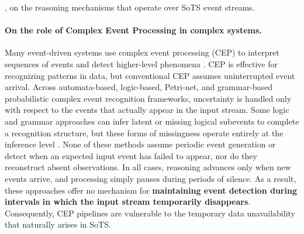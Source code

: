 ,  on the reasoning mechanisms that operate over SoTS event streams. 



\paragraph{On the role of Complex Event Processing in complex systems.}
Many event-driven systems use complex event processing (CEP) to interpret sequences of events and detect higher-level phenomena \cite{luckham2002power}. 
CEP is effective for recognizing patterns in data, but conventional CEP assumes uninterrupted event arrival.
Across automata-based, logic-based, Petri-net, and grammar-based probabilistic complex event recognition frameworks, uncertainty is handled only with respect to the events that actually appear in the input stream. Some logic and grammar approaches can infer latent or missing logical subevents to complete a recognition structure, but these forms of missingness operate entirely at the inference level \cite{alevizos2017probabilistic}. None of these methods assume periodic event generation or detect when an expected input event has failed to appear, nor do they reconstruct absent observations. In all cases, reasoning advances only when new events arrive, and processing simply pauses during periods of silence. As a result, these approaches offer no mechanism for \textbf{maintaining event detection during intervals in which the input stream temporarily disappears}. Consequently, CEP pipelines are vulnerable to the temporary data unavailability that naturally arises in SoTS.


